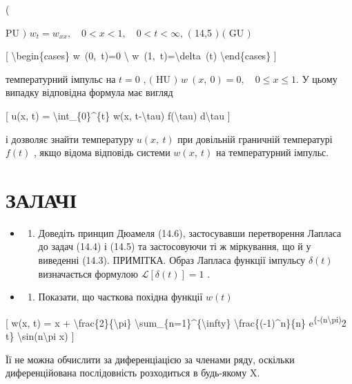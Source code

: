 \documentclass[
]{article}
\providecommand{\tightlist}{%
  \setlength{\itemsep}{0pt}\setlength{\parskip}{0pt}}
\begin{document}
(

PU \()\) \(w_t=w_{xx}, \quad 0< x<1, \quad 0< t<\infty,\) \((\) 14,5
\()\) \((\) GU \()\)

{[} \textbackslash begin\{cases\} w~(0,~t)=0 \textbackslash{}
w~(1,~t)=\textbackslash delta~(t) \textbackslash end\{cases\} {]}

температурний імпульс на \(t=0\) , \((\) HU \()\)
\(w\ (x,\ 0)=0, \quad 0\leqslant x\leqslant 1.\) У цьому випадку
відповідна формула має вигляд

{[} u(x, t) = \textbackslash int\_\{0\}\^{}\{t\} w(x,
t-\textbackslash tau) f(\textbackslash tau) d\textbackslash tau {]}

і дозволяє знайти температуру \(u\left(x,\ t\right)\) при довільній
граничній температурі \(f\left(t\right)\) , якщо відома відповідь
системи \(w\left(x,\ t\right)\) на температурний імпульс.

\section{ЗАЛАЧІ}\label{ux437ux430ux43bux430ux447ux456}

\begin{itemize}
\tightlist
\item
  \begin{enumerate}
  \def\labelenumi{\arabic{enumi}.}
  \tightlist
  \item
    Доведіть принцип Дюамеля (14.6), застосувавши перетворення Лапласа
    до задач (14.4) і (14.5) та застосовуючи ті ж міркування, що й у
    виведенні (14.3). ПРИМІТКА. Образ Лапласа функції імпульсу
    \(\delta(t)\) визначається формулою \(\mathscr{L}[\delta(t)] = 1\) .
  \end{enumerate}
\item
  \begin{enumerate}
  \def\labelenumi{\arabic{enumi}.}
  \setcounter{enumi}{1}
  \tightlist
  \item
    Показати, що часткова похідна функції \(w(t)\)
  \end{enumerate}
\end{itemize}

{[} w(x, t) = x + \textbackslash frac\{2\}\{\textbackslash pi\}
\textbackslash sum\_\{n=1\}\^{}\{\textbackslash infty\}
\textbackslash frac\{(-1)\^{}n\}\{n\}
e\textsuperscript{\{-(n\textbackslash pi)}2 t\}
\textbackslash sin(n\textbackslash pi x) {]}

Її не можна обчислити за диференціацією за членами ряду, оскільки
диференційована послідовність розходиться в будь-якому X.
\end{document}
